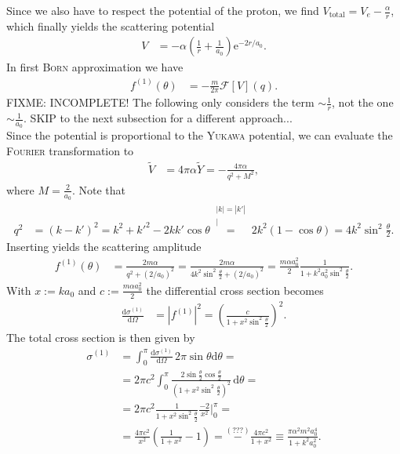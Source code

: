 \documentclass[english, parskip=full]{scrartcl}
\newcommand{\kom}{}
\newcommand{\intx}{}
\newcommand{\kla}{}
\newcommand{\tecxt}{}
\def\e{\text{e}}
\begin{document}
Since we also have to respect the potential of the proton, we find $V_\tecxt\text{total}= V_e-\frac{\alpha}{r}$, which finally yields the scattering potential
\begin{align}
V&=-\alpha\kla\left( {\frac{1}{r}+\frac{1}{a_0}} \right)\e^{-2r/a_0}.
\end{align}
In first \textsc{Born} approximation we have
\begin{align}
f^{(1)}(\theta)&=-\frac{m}{2\pi}\mathcal{F}[V](q).
\end{align}
FIXME: INCOMPLETE! The following only considers the term $\sim\frac{1}{r}$, not the one $\sim\frac{1}{a_0}$.
SKIP to the next subsection for a different approach...
\\
Since the potential is proportional to the \textsc{Yukawa} potential, we can evaluate the \textsc{Fourier} transformation to
\begin{align}
\tilde{V}&=4\pi\alpha\tilde{Y}=-\frac{4\pi\alpha}{q^2+M^2},
\end{align}
where $M=\frac{2}{a_0}$.
Note that 
\begin{align}
q^2&=(k-k')^2=k^2+k'^2-2kk'\cos\theta\kom\overset{\substack{{|k|=|k'|} \\ |}}{=}2k^2(1-\cos\theta)=4k^2\sin^2\frac{\theta}{2}.
\end{align}
Inserting yields the scattering amplitude
\begin{align}
f^{(1)}(\theta)&=\frac{2m\alpha}{q^2+(2/a_0)^2}=\frac{2m\alpha}{4k^2\sin^2\frac{\theta}{2}+(2/a_0)^2}=\frac{m\alpha a_0^2}{2}\frac{1}{1+k^2a_0^2\sin^2\frac{\theta}{2}}.
\end{align}
With $x:=ka_0$ and $c:=\frac{m\alpha a_0^2}{2}$ the differential cross section becomes
\begin{align}
\frac{\tecxt\text{d}\sigma^{(1)}}{\tecxt\text{d}\Omega}&=\left\vert f^{(1)}\right\vert^2=\kla\left( {\frac{c}{1+x^2\sin^2\frac{\theta}{2}}} \right)^2.
\end{align}
The total cross section is then given by
\begin{align}
\sigma^{(1)}&=\intx\int_{0}^{\pi}\frac{\tecxt\text{d}\sigma^{(1)}}{\tecxt\text{d}\Omega}\,2\pi\sin\theta\mathrm{d}\theta=\\
&=2\pi c^2\intx\int_{0}^{\pi}\frac{2\sin\frac{\theta}{2}\cos\frac{\theta}{2}}{\kla\left( {1+x^2\sin^2\frac{\theta}{2}} \right)^2}\,\mathrm{d}\theta=\\
&=2\pi c^2\frac{1}{1+x^2\sin^2\frac{\theta}{2}}\frac{-2}{x^2}\bigg\vert_0^\pi=\\
&=\frac{4\pi c^2}{x^2}\kla\left( {\frac{1}{1+x^2}-1} \right)=\overset{(???)}{-}\frac{4\pi c^2}{1+x^2}\equiv \frac{\pi \alpha^2m^2a_0^4}{1+k^2a_0^2}.
\end{align}
\end{document}
